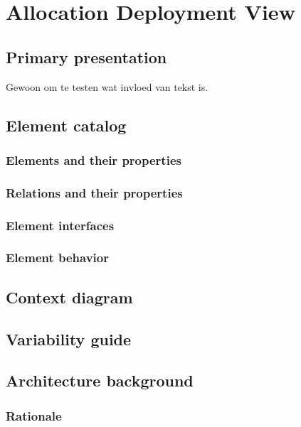 \documentclass[a4paper,10pt]{report}
\begin{document}
\section{Allocation Deployment View}

\subsection{Primary presentation}
Gewoon om te testen wat invloed van tekst is.

\subsection{Element catalog}

\subsubsection{Elements and their properties}

\subsubsection{Relations and their properties}

\subsubsection{Element interfaces}

\subsubsection{Element behavior}

\subsection{Context diagram}

\subsection{Variability guide}

\subsection{Architecture background}

\subsubsection{Rationale}
\end{document}
